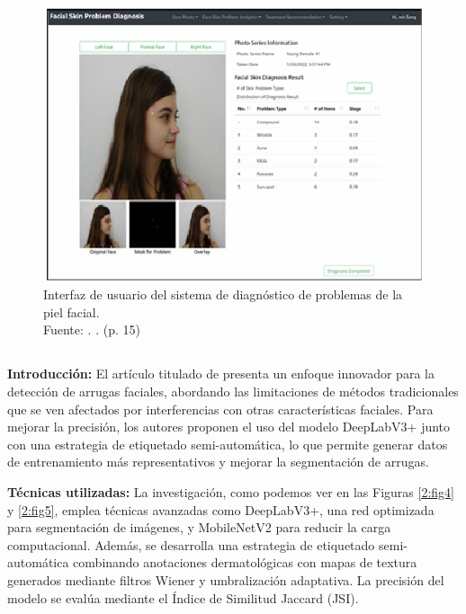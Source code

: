 \begin{figure}[!ht]
	\begin{center}
		\includegraphics[width=1\textwidth]{2/figures/resant2.png}
		\caption[Interfaz de usuario del sistema de diagnóstico de problemas de la piel facial]{Interfaz de usuario del sistema de diagnóstico de problemas de la piel facial.\\
			Fuente: \cite{Kim2023}. . (p. 15)}
		\label{2:fig3}
	\end{center}
\end{figure}



\subsection{}

\textbf{Introducción:}
El artículo titulado  de \cite{Zhong2024} presenta un enfoque innovador para la detección de arrugas faciales, abordando las limitaciones de métodos tradicionales que se ven afectados por interferencias con otras características faciales. Para mejorar la precisión, los autores proponen el uso del modelo DeepLabV3+ junto con una estrategia de etiquetado semi-automática, lo que permite generar datos de entrenamiento más representativos y mejorar la segmentación de arrugas.

\textbf{Técnicas utilizadas:}
La investigación, como podemos ver en las Figuras \ref{2:fig4} y \ref{2:fig5}, emplea técnicas avanzadas como DeepLabV3+, una red optimizada para segmentación de imágenes, y MobileNetV2 para reducir la carga computacional. Además, se desarrolla una estrategia de etiquetado semi-automática combinando anotaciones dermatológicas con mapas de textura generados mediante filtros Wiener y umbralización adaptativa. La precisión del modelo se evalúa mediante el Índice de Similitud Jaccard (JSI).

